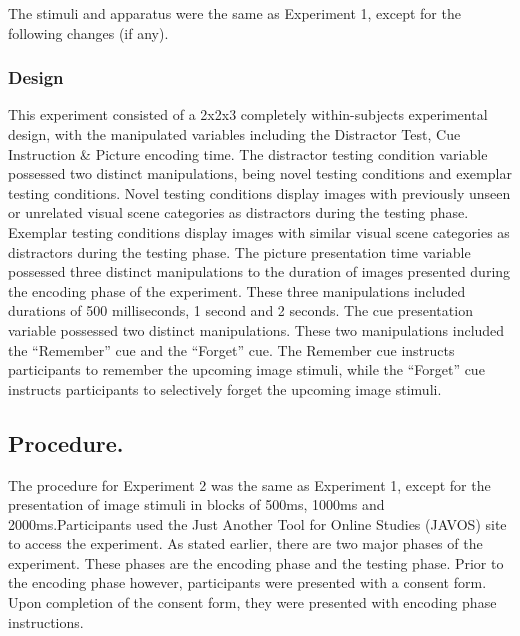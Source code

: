\documentclass[
  english,
  man,floatsintext]{apa6}
\begin{document}
The stimuli and apparatus were the same as Experiment 1, except for the following changes (if any).

\hypertarget{design-1}{%
\subsubsection{Design}\label{design-1}}

This experiment consisted of a 2x2x3 completely within-subjects experimental design, with the manipulated variables including the Distractor Test, Cue Instruction \& Picture encoding time. The distractor testing condition variable possessed two distinct manipulations, being novel testing conditions and exemplar testing conditions. Novel testing conditions display images with previously unseen or unrelated visual scene categories as distractors during the testing phase. Exemplar testing conditions display images with similar visual scene categories as distractors during the testing phase. The picture presentation time variable possessed three distinct manipulations to the duration of images presented during the encoding phase of the experiment. These three manipulations included durations of 500 milliseconds, 1 second and 2 seconds. The cue presentation variable possessed two distinct manipulations. These two manipulations included the \enquote{Remember} cue and the \enquote{Forget} cue. The Remember cue instructs participants to remember the upcoming image stimuli, while the \enquote{Forget} cue instructs participants to selectively forget the upcoming image stimuli.

\hypertarget{procedure.-1}{%
\subsection{Procedure.}\label{procedure.-1}}

The procedure for Experiment 2 was the same as Experiment 1, except for the presentation of image stimuli in blocks of 500ms, 1000ms and 2000ms.Participants used the Just Another Tool for Online Studies (JAVOS) site to access the experiment. As stated earlier, there are two major phases of the experiment. These phases are the encoding phase and the testing phase. Prior to the encoding phase however, participants were presented with a consent form. Upon completion of the consent form, they were presented with encoding phase instructions.
\end{document}
